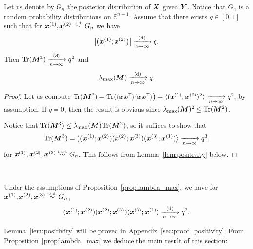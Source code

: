 \documentclass[12pt,nocut]{article}
\begin{document}
\begin{proposition}\label{prop:lambda_max}
	Let us denote by $G_n$ the posterior distribution of ${\boldsymbol X}$ given ${\boldsymbol Y}$. Notice that $G_n$ is a random probability distributions on $\mathbb{S}^{n-1}$.
	Assume that there exists $q \in [0,1]$ such that
	for ${\boldsymbol x}^{(1)},{\boldsymbol x}^{(2)} \overset{\text{\tiny i.i.d.}}{\sim} G_n$ we have
	\begin{equation}\label{eq:rs_condition}
	\big|\big({\boldsymbol x}^{(1)}; {\boldsymbol x}^{(2)}\big)\big| \xrightarrow[n \to \infty]{\rm (d)} q.
	\end{equation}
	Then ${{\rm Tr}}({\boldsymbol M}^2) \xrightarrow[n \to \infty]{\rm (d)} q^2$ and
	$$
	\lambda_{\rm max}({\boldsymbol M}) \xrightarrow[n \to \infty]{\rm (d)} q.
	$$
\end{proposition}
\begin{proof}
	Let us compute ${{\rm Tr}}({\boldsymbol M}^2) = {{\rm Tr}} \big(\langle {\boldsymbol x} {\boldsymbol x}^{{\sf T}} \rangle \langle {\boldsymbol x} {\boldsymbol x}^{{\sf T}} \rangle \big) = \langle ({\boldsymbol x}^{(1)}; {\boldsymbol x}^{(2)})^2 \rangle \xrightarrow[n \to \infty]{} q^2$,
	by assumption. 
	If $q =0$, then the result is obvious since $\lambda_{\rm max}({\boldsymbol M})^2 \leq {{\rm Tr}}({\boldsymbol M}^2)$.

	Notice that ${{\rm Tr}}({\boldsymbol M}^3) \leq \lambda_{\rm max}({\boldsymbol M}) {{\rm Tr}}({\boldsymbol M}^2)$, so it suffices to show that
$$
{\rm Tr}({\boldsymbol M}^3) = \big\langle ({\boldsymbol x}^{(1)};{\boldsymbol x}^{(2)}) ({\boldsymbol x}^{(2)};{\boldsymbol x}^{(3)}) ({\boldsymbol x}^{(3)};{\boldsymbol x}^{(1)}) \big\rangle
\xrightarrow[n \to \infty]{} q^3,
$$
for ${\boldsymbol x}^{(1)},{\boldsymbol x}^{(2)},{\boldsymbol x}^{(3)} \overset{\text{\tiny i.i.d.}}{\sim} G_n$. This follows from Lemma~\ref{lem:positivity} below.
\end{proof}
\\

\begin{lemma}\label{lem:positivity}
	Under the assumptions of Proposition~\ref{prop:lambda_max}, we have for ${\boldsymbol x}^{(1)},{\boldsymbol x}^{(2)},{\boldsymbol x}^{(3)} \overset{\text{\tiny i.i.d.}}{\sim} G_n$,
$$
({\boldsymbol x}^{(1)};{\boldsymbol x}^{(2)}) ({\boldsymbol x}^{(2)};{\boldsymbol x}^{(3)}) ({\boldsymbol x}^{(3)};{\boldsymbol x}^{(1)}) \xrightarrow[n \to \infty]{\rm (d)} q^3.
$$
\end{lemma}
Lemma~\ref{lem:positivity} will be proved in Appendix~\ref{sec:proof_positivity}.
From Proposition~\ref{prop:lambda_max} we deduce the main result of this section:
\end{document}
